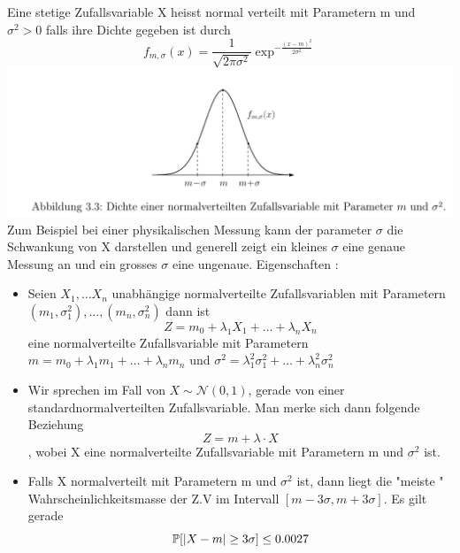\Def[3.29] \newline
Eine stetige Zufallsvariable X heisst normal verteilt mit Parametern m und \( \sigma^2 > 0\) falls ihre Dichte gegeben ist durch \[ f_{m,\sigma}(x) = \frac{1}{\sqrt{2 \pi \sigma^2}}\exp^{-\frac{(x-m)^2}{2 \sigma^2}}\]
\Bem[3.29A] \newline
\includegraphics[scale=0.175]{Dichte_Normalverteilung.png} \\
Zum Beispiel bei einer physikalischen Messung kann der parameter \( \sigma\) die Schwankung von X darstellen und generell zeigt ein kleines \(\sigma\) eine genaue Messung an und ein grosses \(\sigma\) eine ungenaue.
Eigenschaften : \begin{itemize}
    \item Seien \(X_1, \dots X_n\) unabhängige normalverteilte Zufallsvariablen mit Parametern \((m_1, \sigma_1^2), \dots , (m_n, \sigma_n^2)\) dann ist \[ Z = m_0 + \lambda_1 X_1 + \dots + \lambda_n X_n \] eine normalverteilte Zufallsvariable mit Parametern \(m = m_0 + \lambda_1 m_1 + \dots + \lambda_n m_n\) und \(\sigma^2 = \lambda_1^2 \sigma_1^2 + \dots + \lambda_n^2 \sigma_n^2\)
    \item Wir sprechen im Fall von  \( X \sim \mathcal{N}(0,1)\), gerade von einer standardnormalverteilten Zufallsvariable. Man merke sich dann folgende Beziehung \[ Z = m + \lambda \cdot X\], wobei X eine normalverteilte Zufallsvariable mit Parametern m und \(\sigma^2\) ist.
    \item Falls X normalverteilt mit Parametern m und \( \sigma^2 \) ist, dann liegt die "meiste " Wahrscheinlichkeitsmasse der Z.V im Intervall \( [m - 3\sigma, m + 3\sigma ]\). Es gilt gerade \[ \mathbb{P}[\left\lvert X - m \right\rvert \geq 3 \sigma ] \leq 0.0027\]
\end{itemize}

